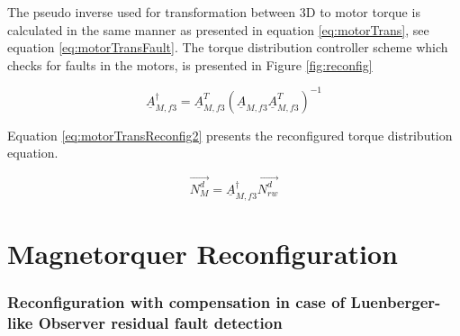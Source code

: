 
The pseudo inverse used for transformation between 3D to motor torque is calculated in the same manner as presented in equation \ref{eq:motorTrans}, see equation \ref{eq:motorTransFault}. The torque distribution controller scheme which checks for faults in the motors, is presented in Figure \ref{fig:reconfig}

\begin{equation}
	\label{eq:motorTransFault}
	\underline{A}_{M,f3}^\dagger   = \underline{A}_{M,f3}^T  (\underline{A}_{M,f3} \underline{A}_{M,f3}^T)^{-1}
\end{equation}
%

Equation \ref{eq:motorTransReconfig2} presents the reconfigured torque distribution equation.

\begin{equation}
\label{eq:motorTransReconfig2}
\vec{N_{M}^d} = \underline{A}_{M,f3}^\dagger \vec{N_{rw}^d}  
\end{equation}






\section{Magnetorquer Reconfiguration}
\label{sec:MTReconfig}

\subsubsection{Reconfiguration with compensation in case of Luenberger-like Observer residual fault detection}

